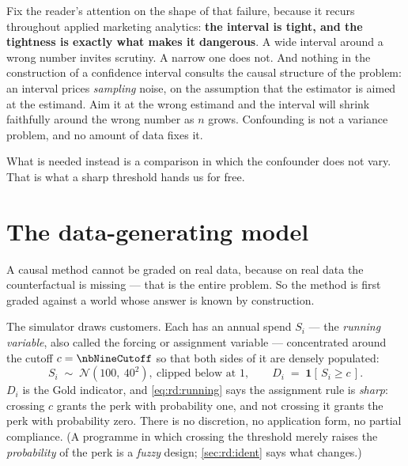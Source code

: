 Fix the reader's attention on the shape of that failure, because it recurs throughout applied
marketing analytics: \textbf{the interval is tight, and the tightness is exactly what makes it
dangerous}. A wide interval around a wrong number invites scrutiny. A narrow one does not. And
nothing in the construction of a confidence interval consults the causal structure of the problem:
an interval prices \emph{sampling} noise, on the assumption that the estimator is aimed at the
estimand. Aim it at the wrong estimand and the interval will shrink faithfully around the wrong
number as $n$ grows. Confounding is not a variance problem, and no amount of data fixes it.

What is needed instead is a comparison in which the confounder does not vary. That is what a sharp
threshold hands us for free.

\section{The data-generating model}
\label{sec:rd:dgm}

A causal method cannot be graded on real data, because on real data the counterfactual is missing
--- that is the entire problem. So the method is first graded against a world whose answer is known
by construction.

The simulator draws \nbNineN{} customers. Each has an annual spend $S_i$ --- the \emph{running
variable}, also called the forcing or assignment variable --- concentrated around the cutoff
$c = \nbNineCutoff$ so that both sides of it are densely populated:
%
\begin{equation}
  S_i \;\sim\; \mathcal N\!\left(100,\ 40^{2}\right), \ \text{clipped below at } 1,
  \qquad
  D_i \;=\; \mathbf 1\!\left[\,S_i \ge c\,\right].
  \label{eq:rd:running}
\end{equation}
%
$D_i$ is the Gold indicator, and \cref{eq:rd:running} says the assignment rule is \emph{sharp}:
crossing $c$ grants the perk with probability one, and not crossing it grants the perk with
probability zero. There is no discretion, no application form, no partial compliance. (A programme
in which crossing the threshold merely raises the \emph{probability} of the perk is a \emph{fuzzy}
design; \cref{sec:rd:ident} says what changes.)

